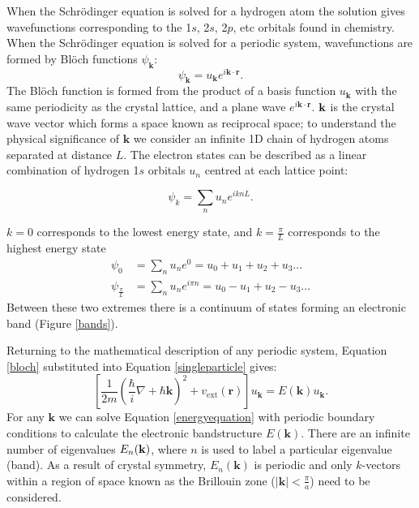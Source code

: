 When the Schr\"{o}dinger equation is solved for a hydrogen atom the solution gives wavefunctions corresponding to the 1$s$, 2$s$, 2$p$, etc orbitals found in chemistry. When the Schr\"{o}dinger equation is solved for a periodic system, wavefunctions are formed by Bl\"{o}ch functions $\psi_{\textbf{k}}$:\autocite{Hoffmann1987}
\begin{equation} \label{bloch}
\psi_{\textbf{k}} = u_\textbf{k}e^{i\textbf{k}\cdot\textbf{r}}.
\end{equation}   %
The Bl\"{o}ch function is formed from the product of a basis function $u_\textbf{k}$ with the same periodicity as the crystal lattice, and a plane wave $e^{i\textbf{k}\cdot\textbf{r}}$. $\textbf k$ is the crystal wave vector which forms a space known as reciprocal space; to understand the physical significance of $\textbf{k}$ we consider an infinite 1D chain of hydrogen atoms separated at distance $L$. The electron states can be described as a linear combination of hydrogen 1$s$ orbitals $u_n$ centred at each lattice point:

\begin{equation} \label{1dbloch}
\psi_k = \sum_nu_ne^{iknL}.
\end{equation}

$k=0$ corresponds to the lowest energy state, and $k=\frac{\pi}{L}$ corresponds to the highest energy state
\begin{align}
\psi_0 &= \sum_nu_ne^0 = u_0 +u_1 +u_2 +u_3 \dots \\
\psi_{\frac{\pi}{L}} &= \sum_nu_ne^{i\pi n} = u_0 -u_1+u_2-u_3 \dots
\end{align}
Between these two extremes there is a continuum of states forming an electronic band (Figure \ref{bands}). 

Returning to the mathematical description of any periodic system, Equation \ref{bloch} substituted into Equation \ref{singleparticle} gives:
\begin{equation} \label{energyequation}
\left[\frac{1}{2m}\left(\frac{\hbar}{i}\nabla+\hbar \textbf{k}\right)^2+v_\textrm{ext}(\textbf{r})\right]u_\textbf{k} = E(\textbf{k})u_\textbf{k}.
\end{equation}
For any $\textbf{k}$ we can solve Equation \ref{energyequation} with periodic boundary conditions to calculate the electronic bandstructure $E(\textbf{k})$. There are an infinite number of eigenvalues $E_n(\textbf{\textbf{k}})$, where $n$ is used to label a particular eigenvalue (band). As a result of crystal symmetry, $E_n(\textbf{k})$ is periodic and only $k$-vectors within a region of space known as the Brillouin zone ($|\textbf{k}|<\frac{\pi}{a}$) need to be considered.\autocite{Lundstrom2000} 

